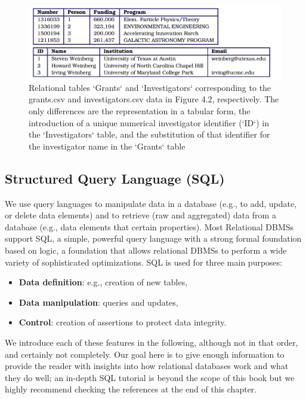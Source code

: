 \documentclass[]{krantz}
\begin{document}
\begin{figure}

{\centering \includegraphics[width=0.7\linewidth]{ChapterDB/figures/figdb-2} 

}

\caption{Relational tables `Grants` and `Investigators` corresponding to the grants.csv and investigators.csv data in Figure 4.2, respectively. The only differences are the representation in a tabular form, the introduction of a unique numerical investigator identifier (`ID`) in the `Investigators` table, and the substitution of that identifier for the investigator name in the `Grants` table}\label{fig:figdb-2}
\end{figure}

\subsection{Structured Query Language
(SQL)}\label{structured-query-language-sql}

We use query languages to manipulate data in a database (e.g., to add,
update, or delete data elements) and to retrieve (raw and aggregated)
data from a database (e.g., data elements that certain properties). Most
Relational DBMSs support SQL, a simple, powerful query language with a
strong formal foundation based on logic, a foundation that allows
relational DBMSs to perform a wide variety of sophisticated
optimizations. SQL is used for three main purposes:

\begin{itemize}
\item
  \textbf{Data definition}: e.g., creation of new tables,
\item
  \textbf{Data manipulation}: queries and updates,
\item
  \textbf{Control}: creation of assertions to protect data integrity.
\end{itemize}

We introduce each of these features in the following, although not in
that order, and certainly not completely. Our goal here is to give
enough information to provide the reader with insights into how
relational databases work and what they do well; an in-depth SQL
tutorial is beyond the scope of this book but we highly recommend
checking the references at the end of this chapter.
\end{document}
